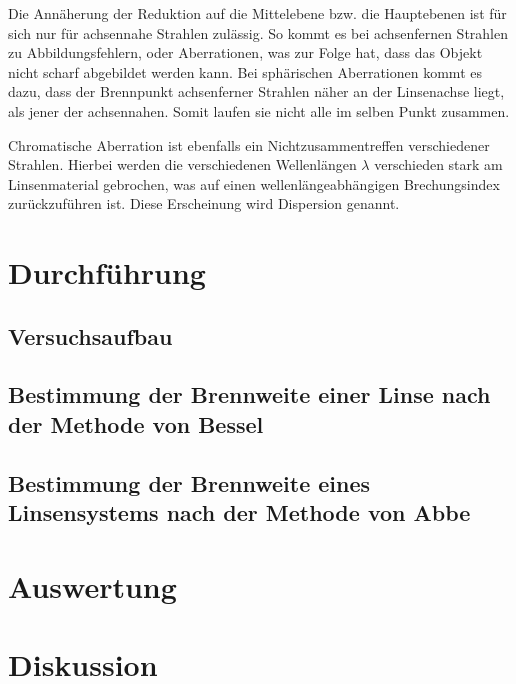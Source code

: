 Die Annäherung der Reduktion auf die Mittelebene bzw. die Hauptebenen ist für sich nur für achsennahe Strahlen zulässig. So kommt
es bei achsenfernen Strahlen zu Abbildungsfehlern, oder Aberrationen, was zur Folge hat, dass das Objekt nicht scharf abgebildet
werden kann. Bei sphärischen Aberrationen kommt es dazu, dass der Brennpunkt achsenferner Strahlen näher an der Linsenachse liegt,
als jener der achsennahen. Somit laufen sie nicht alle im selben Punkt zusammen. 

Chromatische Aberration ist ebenfalls ein Nichtzusammentreffen verschiedener Strahlen. Hierbei werden die verschiedenen Wellenlängen
$\lambda$ verschieden stark am Linsenmaterial gebrochen, was auf einen wellenlängeabhängigen Brechungsindex zurückzuführen ist. Diese
Erscheinung wird Dispersion genannt.

\section{Durchführung}
\subsection{Versuchsaufbau}

\subsection[Methode von Bessel]{Bestimmung der Brennweite einer Linse nach der Methode von Bessel}

\subsection[Methode von Abbe]{Bestimmung der Brennweite eines Linsensystems nach der Methode von Abbe}


\section{Auswertung}

\section{Diskussion}





